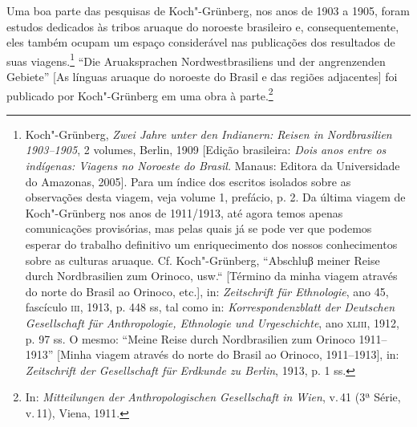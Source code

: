 Uma boa parte das pesquisas de Koch"-Grünberg, nos anos de 1903 a 1905,
foram estudos dedicados às tribos aruaque do noroeste brasileiro e,
consequentemente, eles também ocupam um espaço considerável nas
publicações dos resultados de suas viagens.\footnote{Koch"-Grünberg,
  \emph{Zwei Jahre unter den Indianern: Reisen in Nordbrasilien
  1903--1905}, 2 volumes, Berlin, 1909 {[}Edição brasileira: \emph{Dois
  anos entre os indígenas: Viagens no Noroeste do Brasil.} Manaus:
  Editora da Universidade do Amazonas, 2005{]}. Para um índice dos
  escritos isolados sobre as observações desta viagem, veja volume 1,
  prefácio, p. 2. Da última viagem de Koch"-Grünberg nos anos de
  1911/1913, até agora temos apenas comunicações provisórias, mas pelas
  quais já se pode ver que podemos esperar do trabalho definitivo um
  enriquecimento dos nossos conhecimentos sobre as culturas aruaque. Cf.
  Koch"-Grünberg, ``Abschluβ meiner Reise durch Nordbrasilien zum
  Orinoco, usw.`` {[}Término da minha viagem através do norte do Brasil
  ao Orinoco, etc.{]}, in: \emph{Zeitschrift für Ethnologie}, ano 45,
  fascículo \textsc{iii}, 1913, p. 448 ss, tal como in: \emph{Korrespondenzblatt
  der Deutschen Gesellschaft für Anthropologie, Ethnologie und
  Urgeschichte}, ano \textsc{xliii}, 1912, p. 97 ss. O mesmo: ``Meine Reise durch
  Nordbrasilien zum Orinoco 1911--1913'' {[}Minha viagem através do norte
  do Brasil ao Orinoco, 1911--1913{]}, in: \emph{Zeitschrift der
  Gesellschaft für Erdkunde zu Berlin}, 1913, p. 1 ss.} ``Die
Aruaksprachen Nordwestbrasiliens und der angrenzenden Gebiete'' {[}As
línguas aruaque do noroeste do Brasil e das regiões adjacentes{]} foi
publicado por Koch"-Grünberg em uma obra à parte.\footnote{In:
  \emph{Mitteilungen der Anthropologischen Gesellschaft in Wien}, v.\,41
  (3ª Série, v.\,11), Viena, 1911.}


